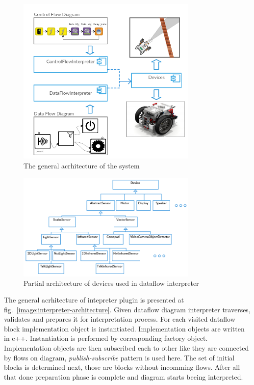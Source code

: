 \documentclass[conference,compsoc]{IEEEtran}
\begin{document}
\begin{figure}[ht]
	\centering
	\includegraphics[width=3.5in]{Common.png}
	\caption{The general acrhitecture of the system}
	\label{image:common-architecture}
\end{figure}

\begin{figure}[ht]
	\centering
	\includegraphics[width=3.5in]{Devices.png}
	\caption{Partial architecture of devices used in dataflow interpreter}
	\label{image:devices-architecture}
\end{figure}

The general acrhitecture of intepreter plugin is presented at fig.~\ref{image:interpreter-architecture}. Given dataflow diagram interpreter traverses, validates and prepares it for interpretation process. For each visited dataflow block implementation object is instantiated. Implementation objects are written in c++. Instantiation is performed by corresponding factory object. Implementation objects are then subscribed each to other like they are connected by flows on diagram, \textit{publish-subscribe} pattern is used here. The set of initial blocks is determined next, those are blocks without incomming flows. After all that done preparation phase is complete and diagram starts beeing interpreted.
\end{document}
